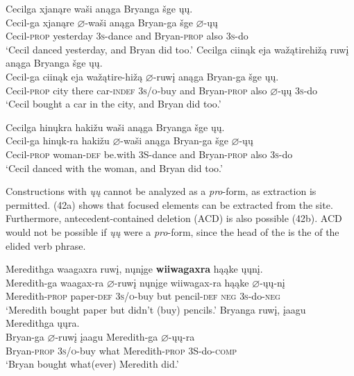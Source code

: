 \documentclass[output=paper]{LSP/langsci}
\begin{document}
\begin{exe}
\ex\label{ex:jrs:41}
\begin{xlist}
\ex 
\glll Cecilga 			xjanąre		wa\v{s}i anąga	Bryanga			\v{s}ge  	\k{u}\k{u}.\\
Cecil-ga			xjanąre		$\varnothing$-wa\v{s}i		anąga	Bryan-ga			\v{s}ge		$\varnothing$-\k{u}\k{u} \\
	Cecil-\textsc{prop}		yesterday	\textsc{3s}-dance	and			Bryan-\textsc{prop}	also	\textsc{3s}-do \\
\trans `Cecil danced yesterday, and Bryan did too.'
\ex 
\glll Cecilga 			ciinąk	eja		wa\v{z}ątirehi\v{z}ą		ruw\k{i}	anąga	Bryanga			\v{s}ge  \k{u}\k{u}. \\
Cecil-ga			ciinąk	eja		wa\v{z}ątire-hi\v{z}ą	$\varnothing$-ruw\k{i}			anąga	Bryan-ga	\v{s}ge \k{u}\k{u}. \\
Cecil-\textsc{prop}	city there	car-\textsc{indef}	\textsc{3s/o}-buy and Bryan-\textsc{prop}	also $\varnothing$-\k{u}\k{u} \textsc{3s}-do \\
\trans `Cecil bought a car in the city, and Bryan did too.'

\ex 
\glll Cecilga 		hin\k{u}kra	haki\v{z}u		wa\v{s}i		anąga	Bryanga			\v{s}ge		\k{u}\k{u}.\\
Cecil-ga		hin\k{u}k-ra	haki\v{z}u		$\varnothing$-wa\v{s}i		anąga	Bryan-ga	\v{s}ge		$\varnothing$-\k{u}\k{u} \\	Cecil-\textsc{prop}		woman-\textsc{def} 	be.with		3S-dance	and			Bryan-\textsc{prop}	also	\textsc{3s}-do \\
\trans `Cecil danced with the woman, and Bryan did too.'
\end{xlist}
\end{exe}

Constructions with \textit{\k{u}\k{u}} cannot be analyzed as a \textit{pro}-form, as  extraction is permitted. (42a) shows that focused elements can be extracted from the  site. Furthermore, antecedent-contained deletion (ACD) is also possible (42b). ACD would not be possible if \textit{\k{u}\k{u}} were a \textit{pro}-form, since the head of the  is the  of the elided verb phrase.

\ea\label{ex:jrs:42}
\ea
\glll Meredithga		waagaxra	ruw\k{i},		n\k{u}n\k{i}ge		\textbf{wiiwagaxra}	hąąke	\k{u}\k{u}n\k{i}.\\
Meredith-ga  waagax-ra	 $\varnothing$-ruw\k{i} 	n\k{u}n\k{i}ge		wiiwagax-ra	hąąke $\varnothing$-\k{u}\k{u}-n\k{i}\\
Meredith-\textsc{prop}	paper-\textsc{def}	\textsc{3s/o}-buy	but pencil-\textsc{def} \textsc{neg}	 \textsc{3s}-do-\textsc{neg}\\
\trans `Meredith bought paper but didn't (buy) pencils.'
\ex 
\glll  Bryanga			ruw\k{i},				\k{i}aagu		Meredithga			\k{u}\k{u}ra.\\
Bryan-ga			$\varnothing$-ruw\k{i}	\k{i}aagu		Meredith-ga	$\varnothing$-\k{u}\k{u}-ra\\
	Bryan-\textsc{prop}	\textsc{3s/o}-buy		what		Meredith-\textsc{prop}		3S-do-\textsc{comp}\\
\trans `Bryan bought what(ever) Meredith did.'
\z
\z
\end{document}
